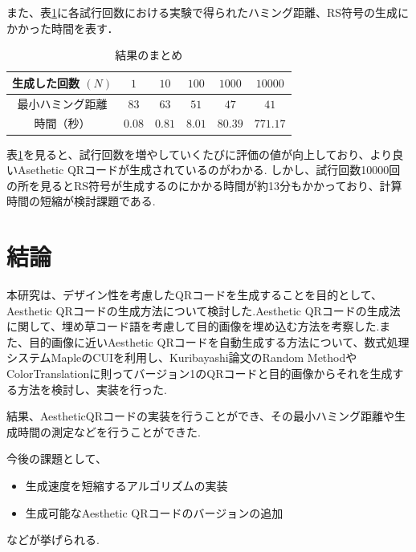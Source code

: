 \documentclass{thesis}
\begin{document}

また、表\ref{summary}に各試行回数における実験で得られたハミング距離、RS符号の生成にかかった時間を表す．

\begin{table}[H]
	\caption{結果のまとめ}
	\begin{center}
  		\begin{tabular}{|c|c|c|c|c|c|} \hline
     		生成した回数 $(N) $&  $1$ & $10$ & $100$ & $1000$ & $10000$  \\  \hline
   			最小ハミング距離 &  $83$ & $63$ & $51$ & $47$ & $41$\\ \hline
			時間（秒） &  $0.08$ & $0.81$ & $8.01$ & $80.39$ & $771.17$\\ \hline
     		\end{tabular}
  	\end{center}
  \label{summary}
\end{table}

表\ref{summary}を見ると、試行回数を増やしていくたびに評価の値が向上しており、より良いAsethetic QRコードが生成されているのがわかる.
しかし、試行回数10000回の所を見るとRS符号が生成するのにかかる時間が約13分もかかっており、計算時間の短縮が検討課題である.
 


\chapter{結論}
\label{chap:5}

本研究は、デザイン性を考慮したQRコードを生成することを目的として、Aesthetic QRコードの生成方法について検討した.Aesthetic QRコードの生成法に関して、埋め草コード語を考慮して目的画像を埋め込む方法を考察した.また、目的画像に近いAesthetic QRコードを自動生成する方法について、数式処理システムMapleのCUIを利用し、Kuribayashi論文のRandom MethodやColorTranslationに則ってバージョン1のQRコードと目的画像からそれを生成する方法を検討し、実装を行った.

結果、AestheticQRコードの実装を行うことができ、その最小ハミング距離や生成時間の測定などを行うことができた.

今後の課題として、
\begin{itemize}
\setlength{\itemsep}{5mm}
 \item 生成速度を短縮するアルゴリズムの実装
 \item 生成可能なAesthetic QRコードのバージョンの追加
 \end{itemize}
などが挙げられる.
\end{document}
